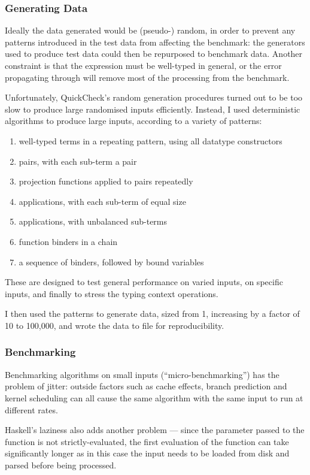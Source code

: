 \subsubsection{Generating Data}
Ideally the data generated would be (pseudo-) random, in order to prevent any patterns introduced in the test data from affecting the benchmark: the generators used to produce test data could then be repurposed to benchmark data.
Another constraint is that the expression must be well-typed in general, or the error propagating through will remove most of the processing from the benchmark.

Unfortunately, QuickCheck's random generation procedures turned out to be too slow to produce large randomised inputs efficiently.
Instead, I used deterministic algorithms to produce large inputs, according to a variety of patterns:
\begin{enumerate}
\item well-typed terms in a repeating pattern, using all datatype constructors
\item pairs, with each sub-term a pair
\item projection functions applied to pairs repeatedly
\item applications, with each sub-term of equal size
\item applications, with unbalanced sub-terms
\item function binders in a chain
\item a sequence of binders, followed by bound variables
\end{enumerate}
These are designed to test general performance on varied inputs, on specific inputs, and finally to stress the typing context operations.

I then used the patterns to generate data, sized from 1, increasing by a factor of 10 to 100,000, and wrote the data to file for reproducibility.

\subsubsection{Benchmarking}
Benchmarking algorithms on small inputs (``micro-benchmarking'') has the problem of jitter: outside factors such as cache effects, branch prediction and kernel scheduling can all cause the same algorithm with the same input to run at different rates.

Haskell's laziness also adds another problem --- since the parameter passed to the function is not strictly-evaluated, the first evaluation of the function can take significantly longer as in this case the input needs to be loaded from disk and parsed before being processed.


